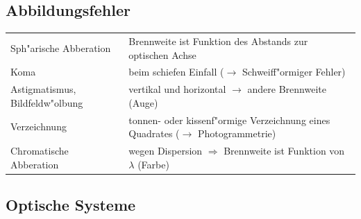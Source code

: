 \subsection{Abbildungsfehler}
\begin{tabular}{ll}
Sph"arische Abberation & Brennweite ist Funktion des Abstands zur optischen Achse \\
Koma & beim schiefen Einfall ($\rightarrow$ Schweiff"ormiger Fehler) \\
Astigmatismus, Bildfeldw"olbung & vertikal und horizontal $\rightarrow$ andere Brennweite (Auge) \\
Verzeichnung & tonnen- oder kissenf"ormige Verzeichnung eines Quadrates ($\rightarrow$ Photogrammetrie) \\
Chromatische Abberation & wegen Dispersion $\Rightarrow$ Brennweite ist Funktion von $\lambda$ (Farbe) \\
\end{tabular}

\subsection{Optische Systeme}
